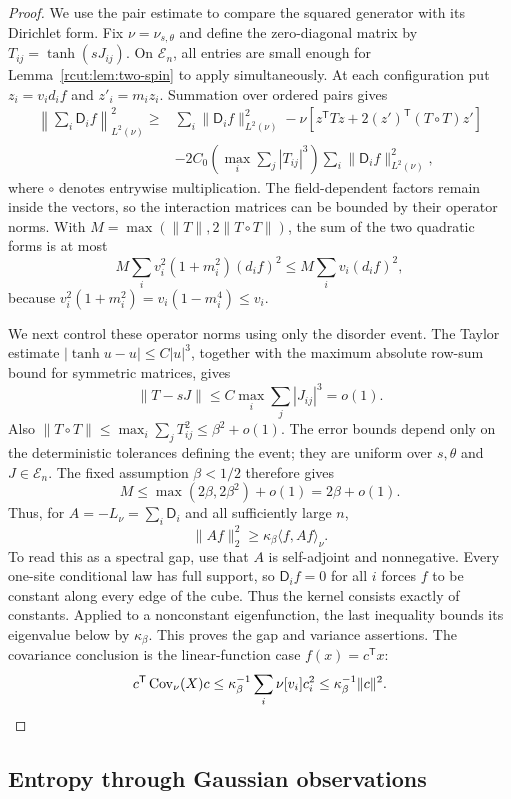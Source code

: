 \begin{proof}
We use the pair estimate to compare the squared generator with its
Dirichlet form.  Fix $\nu=\nu_{s,\theta}$ and define the zero-diagonal
matrix by $T_{ij}=\tanh(sJ_{ij})$.  On $\mathcal E_n$, all entries are
small enough for Lemma~\ref{rcut:lem:two-spin} to apply simultaneously.
At each configuration put $z_i=v_i d_i f$ and $z'_i=m_i z_i$.
Summation over ordered pairs gives
\begin{align*}
 \left\|\sum_i\mathsf D_i f\right\|_{L^2(\nu)}^2
 \ge{}&\sum_i\|\mathsf D_i f\|_{L^2(\nu)}^2
       -\nu[z^{\mathsf T}Tz+2(z')^{\mathsf T}(T\circ T)z']\\
 &-2C_0\left(\max_i\sum_j|T_{ij}|^3\right)
               \sum_i\|\mathsf D_i f\|_{L^2(\nu)}^2,
\end{align*}
where $\circ$ denotes entrywise multiplication.  The field-dependent
factors remain inside the vectors, so the interaction matrices can be
bounded by their operator norms.  With
$M=\max(\|T\|,2\|T\circ T\|)$, the sum of the two quadratic forms is
at most
\[
 M\sum_i v_i^2(1+m_i^2)(d_i f)^2
 \le M\sum_i v_i(d_i f)^2,
\]
because $v_i^2(1+m_i^2)=v_i(1-m_i^4)\le v_i$.

We next control these operator norms using only the disorder event.
The Taylor estimate $|\tanh u-u|\le C|u|^3$, together with the
maximum absolute row-sum bound for symmetric matrices, gives
\[
 \|T-sJ\|\le C\max_i\sum_j|J_{ij}|^3=o(1).
\]
Also $\|T\circ T\|\le\max_i\sum_jT_{ij}^2\le\beta^2+o(1)$.
The error bounds depend only on the deterministic tolerances defining
the event; they are uniform over $s,\theta$ and $J\in\mathcal E_n$.
The fixed assumption $\beta<1/2$ therefore gives
\[
 M\le\max(2\beta,2\beta^2)+o(1)=2\beta+o(1).
\]
Thus, for $A=-L_\nu=\sum_i\mathsf D_i$ and all sufficiently large $n$,
\[
 \|Af\|_2^2\ge\kappa_\beta\langle f,Af\rangle_\nu.
\]
To read this as a spectral gap, use that $A$ is self-adjoint and
nonnegative.  Every one-site conditional law has full support, so
$\mathsf D_i f=0$ for all $i$ forces $f$ to be constant along every
edge of the cube.  Thus the kernel consists exactly of constants.
Applied to a nonconstant eigenfunction, the last inequality bounds its
eigenvalue below by $\kappa_\beta$.  This proves the gap and variance
assertions.  The covariance conclusion is the linear-function case
$f(x)=c^{\mathsf T}x$:
\[
 c^{\mathsf T}\operatorname{Cov}_\nu(X)c
 \le\kappa_\beta^{-1}\sum_i\nu[v_i]c_i^2
 \le\kappa_\beta^{-1}\|c\|^2.
\]
\end{proof}

\subsection{Entropy through Gaussian observations}

